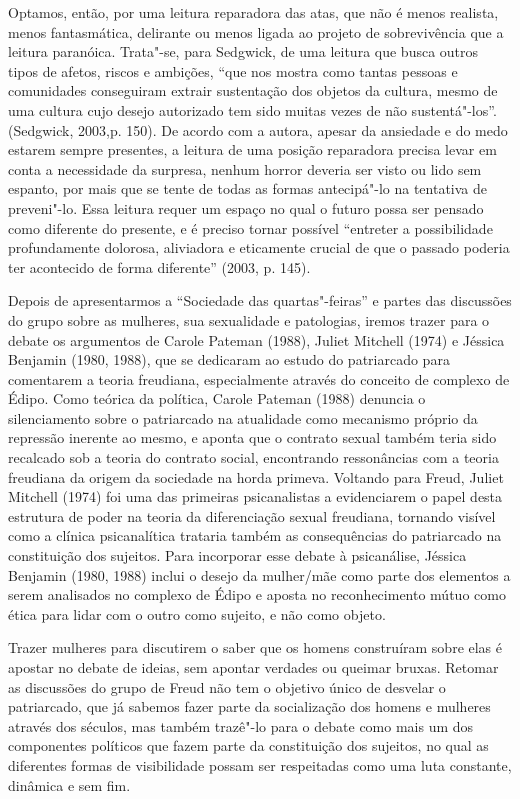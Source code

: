 Optamos, então, por uma leitura reparadora das atas, que não é menos
realista, menos fantasmática, delirante ou menos ligada ao projeto de
sobrevivência que a leitura paranóica. Trata"-se, para Sedgwick, de uma
leitura que busca outros tipos de afetos, riscos e ambições, ``que nos
mostra como tantas pessoas e comunidades conseguiram extrair sustentação
dos objetos da cultura, mesmo de uma cultura cujo desejo autorizado tem
sido muitas vezes de não sustentá"-los''. (Sedgwick, 2003,p. 150). De
acordo com a autora, apesar da ansiedade e do medo estarem sempre
presentes, a leitura de uma posição reparadora precisa levar em conta a
necessidade da surpresa, nenhum horror deveria ser visto ou lido sem
espanto, por mais que se tente de todas as formas antecipá"-lo na
tentativa de preveni"-lo. Essa leitura requer um espaço no qual o futuro
possa ser pensado como diferente do presente, e é preciso tornar
possível ``entreter a possibilidade profundamente dolorosa, aliviadora e
eticamente crucial de que o passado poderia ter acontecido de forma
diferente'' (2003, p. 145).

Depois de apresentarmos a ``Sociedade das quartas"-feiras'' e partes das
discussões do grupo sobre as mulheres, sua sexualidade e patologias,
iremos trazer para o debate os argumentos de Carole Pateman (1988),
Juliet Mitchell (1974) e Jéssica Benjamin (1980, 1988), que se dedicaram
ao estudo do patriarcado para comentarem a teoria freudiana,
especialmente através do conceito de complexo de Édipo. Como teórica da
política, Carole Pateman (1988) denuncia o silenciamento sobre o
patriarcado na atualidade como mecanismo próprio da repressão inerente
ao mesmo, e aponta que o contrato sexual também teria sido recalcado sob
a teoria do contrato social, encontrando ressonâncias com a teoria
freudiana da origem da sociedade na horda primeva. Voltando para Freud,
Juliet Mitchell (1974) foi uma das primeiras psicanalistas a
evidenciarem o papel desta estrutura de poder na teoria da diferenciação
sexual freudiana, tornando visível como a clínica psicanalítica trataria
também as consequências do patriarcado na constituição dos sujeitos.
Para incorporar esse debate à psicanálise, Jéssica Benjamin (1980, 1988)
inclui o desejo da mulher/mãe como parte dos elementos a serem
analisados no complexo de Édipo e aposta no reconhecimento mútuo como
ética para lidar com o outro como sujeito, e não como objeto.

Trazer mulheres para discutirem o saber que os homens construíram sobre
elas é apostar no debate de ideias, sem apontar verdades ou queimar
bruxas. Retomar as discussões do grupo de Freud não tem o objetivo único
de desvelar o patriarcado, que já sabemos fazer parte da socialização
dos homens e mulheres através dos séculos, mas também trazê"-lo para o
debate como mais um dos componentes políticos que fazem parte da
constituição dos sujeitos, no qual as diferentes formas de visibilidade
possam ser respeitadas como uma luta constante, dinâmica e sem fim.

